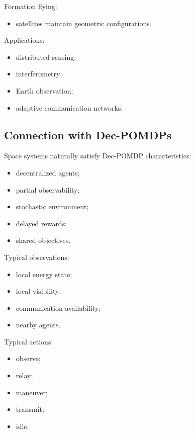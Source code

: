 \documentclass[10pt,a4paper,twocolumn]{article}
\begin{document}
Formation flying:
\begin{itemize}
    \item satellites maintain geometric configurations.
\end{itemize}

Applications:
\begin{itemize}
    \item distributed sensing;
    \item interferometry;
    \item Earth observation;
    \item adaptive communication networks.
\end{itemize}


\subsection{Connection with Dec-POMDPs}

Space systems naturally satisfy Dec-POMDP characteristics:
\begin{itemize}
    \item decentralized agents;
    \item partial observability;
    \item stochastic environment;
    \item delayed rewards;
    \item shared objectives.
\end{itemize}

Typical observations:
\begin{itemize}
    \item local energy state;
    \item local visibility;
    \item communication availability;
    \item nearby agents.
\end{itemize}

Typical actions:
\begin{itemize}
    \item observe;
    \item relay;
    \item maneuver;
    \item transmit;
    \item idle.
\end{itemize}
\end{document}
